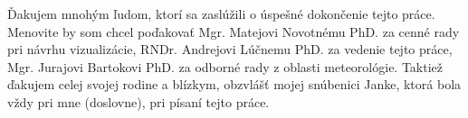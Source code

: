 \thispagestyle{empty}
\vspace*{\fill}
\hfill
\begin{minipage}{0.65\textwidth}
\vspace{0pt}\raggedright

Ďakujem mnohým ľudom, ktorí sa zaslúžili o úspešné dokončenie tejto práce. Menovite by som chcel poďakovať Mgr. Matejovi Novotnému PhD. za cenné rady pri návrhu vizualizácie, RNDr. Andrejovi Lúčnemu PhD. za vedenie tejto práce, Mgr. Jurajovi Bartokovi PhD. za odborné rady z oblasti meteorológie. Taktiež ďakujem celej svojej rodine a blízkym, obzvlášť mojej snúbenici Janke, ktorá bola vždy pri mne (doslovne), pri písaní tejto práce.

\end{minipage}
\vspace*{\fill}
\eject